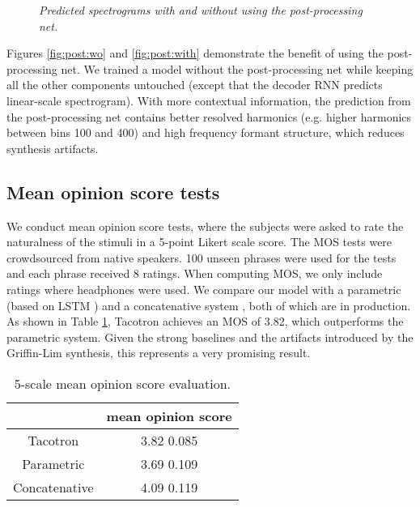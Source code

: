 \documentclass{article} \usepackage{iclr2017_conference,times}
\begin{document}
\begin{figure}[t]
\centering
{}
\caption{{\it Predicted spectrograms with and without using the post-processing net.}}
\label{fig:post}
\end{figure}

Figures \ref{fig:post:wo} and \ref{fig:post:with} demonstrate the benefit of using the post-processing net. We trained a model without the post-processing net while keeping all the other components untouched (except that the decoder RNN predicts linear-scale spectrogram). With more contextual information, the prediction from the post-processing net contains better resolved harmonics (e.g. higher harmonics between bins 100 and 400) and high frequency formant structure, which reduces synthesis artifacts.


\subsection{Mean opinion score tests}
\label{sec.mos}
We conduct mean opinion score tests, where the subjects were asked to rate the naturalness of the stimuli in a 5-point Likert scale score. The MOS tests were crowdsourced from native speakers. 100 unseen phrases were used for the tests and each phrase received 8 ratings. When computing MOS, we only include ratings where headphones were used. We compare our model with a parametric (based on LSTM \citep{zen2016fast}) and a concatenative system \citep{gonzalvo2016recent}, both of which are in production. As shown in Table \ref{tb.mos}, Tacotron achieves an MOS of 3.82, which outperforms the parametric system. Given the strong baselines and the artifacts introduced by the Griffin-Lim synthesis, this represents a very promising result.


\begin{table}[htp!]
\centering
\caption{5-scale mean opinion score evaluation.}
\label{tb.mos}
\begin{tabular}{c|c}
\hline
 & mean opinion score \\ \hline
Tacotron & 3.82   0.085  \\ \hline
Parametric & 3.69  0.109 \\ \hline
Concatenative & 4.09   0.119 \\ \hline
\end{tabular}
\end{table}
\end{document}
